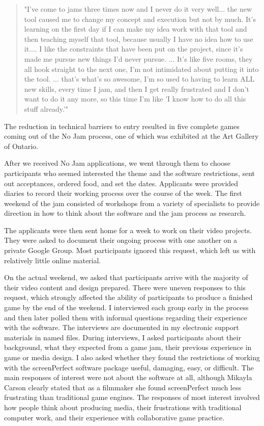 \begin{quote}
"I've come to jams three times now and I never do it very well... the new tool caused me to change my concept and execution but not by much. It's learning on the first day if I can make my idea work with that tool and then teaching myself that tool, because usually I have no idea how to use it.... I like the constraints that have been put on the project, since it's made me pursue new things I'd never pursue. ... It's like five rooms, they all hook straight to the next one, I'm not intimidated about putting it into the tool. ... that's what's so awesome, I'm so used to having to learn ALL new skills, every time I jam, and then I get really frustrated and I don't want to do it any more, so this time I'm like 'I know how to do all this stuff already.'"
\end{quote}

The reduction in technical barriers to entry resulted in five complete games coming out of the No Jam process, one of which was exhibited at the Art Gallery of Ontario.

After we received No Jam applications, we went through them to choose participants who seemed interested the theme and the software restrictions, sent out acceptances, ordered food, and set the dates. Applicants were provided diaries to record their working process over the course of the week. The first weekend of the jam consisted of workshops from a variety of specialists to provide direction in how to think about the software and the jam process as research.

The applicants were then sent home for a week to work on their video projects. They were asked to document their ongoing process with one another on a private Google Group. Most participants ignored this request, which left us with relatively little online material.

On the actual weekend, we asked that participants arrive with the majority of their video content and design prepared. There were uneven responses to this request, which strongly affected the ability of participants to produce a finished game by the end of the weekend. I interviewed each group early in the process and then later polled them with informal questions regarding their experience with the software. The interviews are documented in my electronic support materials in named files. During interviews, I asked participants about their background, what they expected from a game jam, their previous experience in game or media design. I also asked whether they found the restrictions of working with the screenPerfect software package useful, damaging, easy, or difficult. The main responses of interest were not about the software at all, although Mikayla Carson clearly stated that as a filmmaker she found screenPerfect much less frustrating than traditional game engines. The responses of most interest involved how people think about producing media, their frustrations with traditional computer work, and their experience with collaborative game practice.

